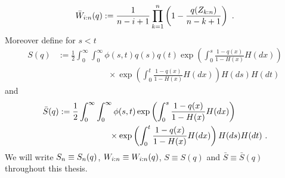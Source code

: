 $$\bar{W}_{i:n}(q) := \frac{1}{n-i+1}\prod_{k=1}^{n}\left(1-\frac{q(Z_{k:n})}{n-k+1}\right)\textrm{ .}$$
Moreover define for $s<t$
\begin{align*}
S(q) &:= \frac{1}{2}\int_{0}^{\infty} \int_{0}^{\infty} \phi(s,t) q(s)q(t) \exp\left(\int_{0}^{s} \frac{1-q(x)}{1-H(x)} H(dx)\right)\\
&\qquad\qquad\qquad \times \exp\left(\int_{0}^{t} \frac{1-q(x)}{1-H(x)} H(dx) \right)H(ds)H(dt)
\end{align*}
and 
\begin{align*}
\bar{S}(q) &:= \frac{1}{2}\int_{0}^{\infty} \int_{0}^{\infty} \phi(s,t)  \exp\left(\int_{0}^{s} \frac{1-q(x)}{1-H(x)} H(dx)\right)\\
&\qquad\qquad\qquad \times \exp\left(\int_{0}^{t} \frac{1-q(x)}{1-H(x)} H(dx) \right)H(ds)H(dt)\textrm{ .}
\end{align*}
We will write $S_{n} \equiv S_{n}(q)$, $W_{i:n} \equiv W_{i:n}(q)$, $S\equiv S(q)$ and $\bar S\equiv \bar S(q)$ throughout this thesis.
%

